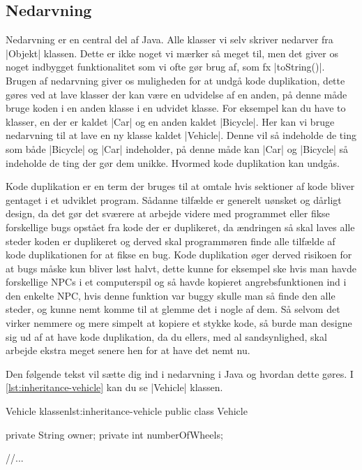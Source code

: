 \subsection{Nedarvning}

Nedarvning er en central del af Java. Alle klasser vi selv skriver
nedarver fra \JavaInline|Objekt| klassen. Dette er ikke noget vi
mærker så meget til, men det giver os noget indbygget funktionalitet
som vi ofte gør brug af, som fx \JavaInline|toString()|. Brugen af
nedarvning giver os muligheden for at undgå kode duplikation, dette
gøres ved at lave klasser der kan være en udvidelse af en anden, på
denne måde bruge koden i en anden klasse i en udvidet klasse. For
eksempel kan du have to klasser, en der er kaldet \JavaInline|Car| og
en anden kaldet \JavaInline|Bicycle|. Her kan vi bruge nedarvning til
at lave en ny klasse kaldet \JavaInline|Vehicle|. Denne vil så
indeholde de ting som både \JavaInline|Bicycle| og \JavaInline|Car|
indeholder, på denne måde kan \JavaInline|Car| og \JavaInline|Bicycle|
så indeholde de ting der gør dem unikke. Hvormed kode duplikation kan
undgås.

Kode duplikation er en term der bruges til at omtale hvis sektioner af
kode bliver gentaget i et udviklet program. Sådanne tilfælde er
generelt uønsket og dårligt design, da det gør det sværere at arbejde
videre med programmet eller fikse forskellige bugs opstået fra kode
der er duplikeret, da ændringen så skal laves alle steder koden er
duplikeret og derved skal programmøren finde alle tilfælde af kode
duplikationen for at fikse en bug. Kode duplikation øger derved
risikoen for at bugs måske kun bliver løst halvt, dette kunne for
eksempel ske hvis man havde forskellige NPCs i et computerspil og så
havde kopieret angrebsfunktionen ind i den enkelte NPC, hvis denne
funktion var buggy skulle man så finde den alle steder, og kunne nemt
komme til at glemme det i nogle af dem. Så selvom det virker nemmere
og mere simpelt at kopiere et stykke kode, så burde man designe sig ud
af at have kode duplikation, da du ellers, med al sandsynlighed, skal
arbejde ekstra meget senere hen for at have det nemt nu.

Den følgende tekst vil sætte dig ind i nedarvning i Java og hvordan
dette gøres. I \autoref{lst:inheritance-vehicle} kan du se
\JavaInline|Vehicle| klassen.

\begin{JavaCode}{Vehicle klassen}{lst:inheritance-vehicle}
	public class Vehicle {

		private String owner;
		private int numberOfWheels;

		//...
	}
\end{JavaCode}

